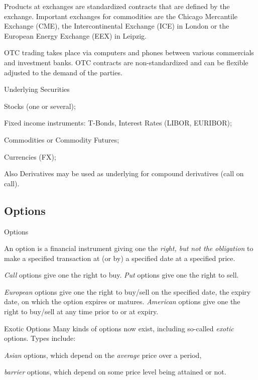 	Products at exchanges are standardized contracts that are defined by the exchange. Important exchanges for commodities are the Chicago Mercantile Exchange (CME), the Intercontinental Exchange (ICE) in London or the European Energy Exchange (EEX) in Leipzig.

	OTC trading takes place via computers and phones between various commercials and investment banks. OTC contracts are non-standardized and can be flexible adjusted to the demand of the parties.


{Underlying Securities}


	Stocks (one or several);

	Fixed income instruments: T-Bonds, Interest Rates (LIBOR, EURIBOR);

	Commodities or Commodity Futures;

	Currencies (FX);

	Also Derivatives may be used as underlying for compound derivatives (call on call).


\subsection{Options}

{Options}


	An option is a financial instrument giving one the {\it right, but
not the obligation} to make a specified transaction at (or by) a
specified date at a specified price.

	{\it Call} options give one
the right to buy. {\it Put} options give one the right to sell.

	{\it European} options give one the right to buy/sell on the
specified date, the expiry date, on which the option expires or
matures. {\it American} options give one the right to buy/sell at any time
prior to or at expiry.


{Exotic Options}
Many kinds of options now exist, including so-called {\it exotic}
options.  Types include:


	{\it Asian} options, which depend on the
{\it average} price over a period,

	{\it barrier} options, which depend on some price level being
attained or not.

